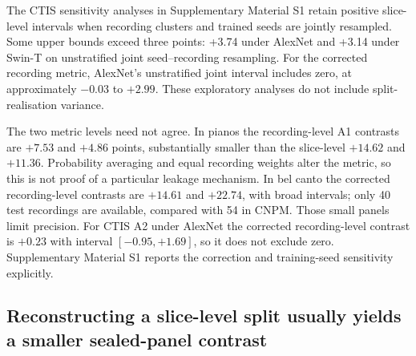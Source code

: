 The CTIS sensitivity analyses in Supplementary Material S1 retain positive slice-level
intervals when recording clusters and trained seeds are jointly resampled. Some upper bounds
exceed three points: +3.74 under AlexNet and +3.14 under Swin-T on unstratified joint
seed--recording resampling. For the corrected
recording metric, AlexNet's unstratified joint interval includes zero, at approximately
$-0.03$ to $+2.99$. These exploratory analyses do not include split-realisation variance.

The two metric levels need not agree. In pianos the recording-level A1 contrasts are
$+7.53$ and $+4.86$ points, substantially smaller than the slice-level $+14.62$ and $+11.36$.
Probability averaging and equal recording weights alter the metric, so this is not proof of a
particular leakage mechanism. In bel canto the corrected recording-level contrasts are
$+14.61$ and $+22.74$, with broad intervals; only 40 test recordings are available, compared
with 54 in CNPM. Those small panels limit precision. For CTIS A2 under AlexNet the corrected
recording-level contrast is $+0.23$ with interval $[-0.95,+1.69]$, so it does not exclude zero.
Supplementary Material S1 reports the correction and training-seed sensitivity explicitly.

\subsection{Reconstructing a slice-level split usually yields a smaller sealed-panel contrast}

